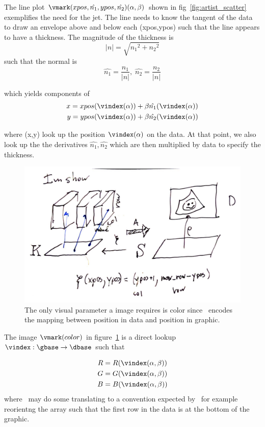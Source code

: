 \documentclass[../main.tex]{subfiles}
\begin{document}
The line plot $\vmark(xpos, \hat{n_{1}}, ypos, \hat{n_{2}})(\alpha, \beta)$ shown in fig~\ref{fig:artist_scatter} exemplifies the need for the jet. The line needs to know the tangent of the data to draw an envelope above and below each (xpos,ypos) such that the line appears to have a thickness. The magnitude of the thickness is 
\begin{equation}
    \lvert n \rvert = \sqrt{{n_{1}}^2 + {n_{2}}^2}
\end{equation}
such that the normal is  
\begin{equation}
    \hat{n_{1}} = \frac{n_1}{\lvert n \rvert}, \; \hat{n_{2}} = \frac{n_2}{\lvert n \rvert}
\end{equation}

which yields components of \gsection
\begin{align}
 x = xpos(\vindex(\alpha)) &+ \beta\hat{n_1}(\vindex(\alpha)) \\
 y = ypos(\vindex(\alpha)) &+ \beta\hat{n_2}(\vindex(\alpha)) 
\end{align}

where (x,y) look up the position $\vindex(\alpha)$ on the data. At that point, we also look up the the derivatives $\hat{n_1}, \hat{n_2}$  which are then multiplied by data to specify the thickness. 

\begin{figure}[H]
    \includegraphics[width=.75\textwidth]{figures/math/heatmap.png}
    \caption{The only visual parameter a image requires is color since \vindex\ encodes the mapping between position in data and position in graphic. }
    \label{fig:artist_heatmap}
\end{figure}

The image $\vmark(color)$ in figure~\ref{fig:artist_heatmap} is a direct lookup $\vindex:\gbase\rightarrow\dbase$ such that 

\begin{align}
R &= R(\vindex(\alpha, \beta))\\
G &= G(\vindex(\alpha, \beta))\\
B &= B(\vindex(\alpha, \beta))
\end{align}
where \vindex\ may do some translating to a convention expected by \vmark\, for example reorientng the array such that the first row in the data is at the bottom of the graphic. 
\end{document}
